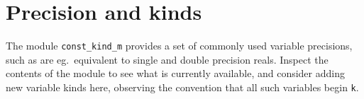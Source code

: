 \documentclass[11pt,twoside,a4paper]{report}
\begin{document}


  
\section{Precision and kinds}
The module \verb|const_kind_m| provides  a set of commonly used variable
precisions, such as are eg.\ equivalent to single and double precision reals.
Inspect the contents of the module to see what is currently available,
and consider adding new variable kinds here, observing the
convention that all such variables begin \verb|k|.
%
%
%
%
\end{document}
